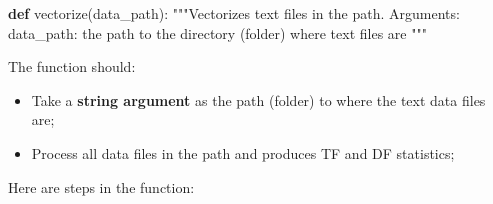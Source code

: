 \documentclass[
  letterpaper,
]{scrbook}
\newenvironment{Shaded}{\begin{snugshade}}{\end{snugshade}}
\newcommand{\CommentTok}[1]{\textcolor[rgb]{0.37,0.37,0.37}{#1}}
\newcommand{\KeywordTok}[1]{\textcolor[rgb]{0.00,0.23,0.31}{\textbf{#1}}}
\newcommand{\NormalTok}[1]{\textcolor[rgb]{0.00,0.23,0.31}{#1}}
\providecommand{\tightlist}{%
  \setlength{\itemsep}{0pt}\setlength{\parskip}{0pt}}
\begin{document}
\begin{Shaded}
\begin{Highlighting}[]
\KeywordTok{def}\NormalTok{ vectorize(data\_path):}
    \CommentTok{"""Vectorizes text files in the path. }
\CommentTok{    Arguments: }
\CommentTok{        data\_path: the path to the directory (folder) where text files are}
\CommentTok{    """}
\end{Highlighting}
\end{Shaded}

The function should:

\begin{itemize}
\tightlist
\item
  Take a \textbf{string argument} as the path (folder) to where the text
  data files are;
\item
  Process all data files in the path and produces TF and DF statistics;
\end{itemize}

Here are steps in the function:
\end{document}
